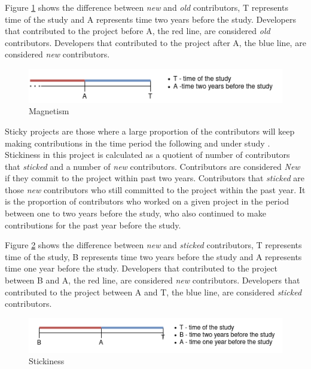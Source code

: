Figure \ref{fig:magnetism} shows the difference between \emph{new} and \emph{old} contributors, T represents time of the study and A represents time two years before the study.
Developers that contributed to the project before A, the red line, are considered \emph{old} contributors.
Developers that contributed to the project after A, the blue line, are considered \emph{new} contributors.

\begin{figure}
    \centering
    \includegraphics[scale=0.75]{chapters/chapter2/magnetism-new.png}
    \caption{Magnetism}
    \label{fig:magnetism}
\end{figure}

Sticky projects are those where a large proportion of the contributors will keep making contributions in the time period the following and under study \cite{p:11}.
Stickiness in this project is calculated as a quotient of number of contributors that \emph{sticked} and a number of \emph{new} contributors.
Contributors are considered \emph{New} if they commit to the project within past two years.
Contributors that \emph{sticked} are those \emph{new} contributors who still committed to the project within the past year.
It is the proportion of contributors who worked on a given project in the period between one to two years before the study, who also continued to make contributions for the past year before the study.

Figure \ref{fig:stickiness} shows the difference between \emph{new} and \emph{sticked} contributors, T represents time of the study, B represents time two years before the study and A represents time one year before the study.
Developers that contributed to the project between B and A, the red line, are considered \emph{new} contributors.
Developers that contributed to the project between A and T, the blue line, are considered \emph{sticked} contributors.

\begin{figure}
    \centering
    \includegraphics[scale=0.75]{chapters/chapter2/stickiness-new.png}
    \caption{Stickiness}
    \label{fig:stickiness}
\end{figure}

